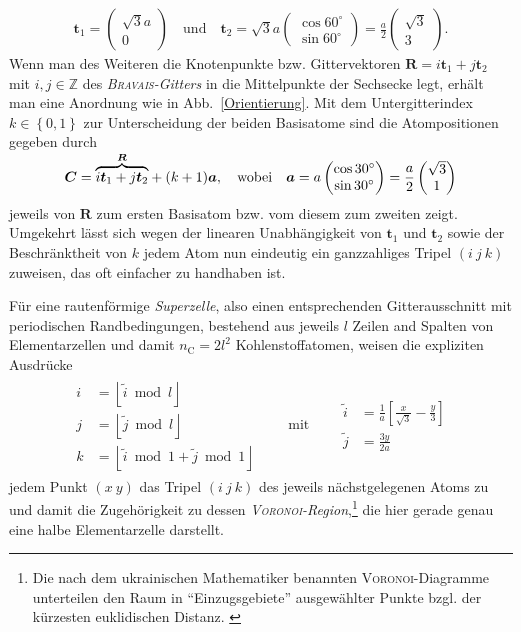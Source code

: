 \documentclass[a4paper, 10pt, twoside, openany]{book} %
\newcommand \bracks[1]{\left [ #1 \right ]}
\newcommand \braces[1]{\left \lbrace #1 \right \rbrace}
\newcommand \floor[1]{\left \lfloor #1 \right \rfloor}
\def \mod {\bmod}
\def \vec {\boldsymbol}
\newcommand \mat[1]{\begin{pmatrix} #1 \end{pmatrix}}
\def \nC {n_\mathrm{C}}
\begin{document}
%
\begin{align*}
    \vec t_1 = \mat{\sqrt 3 a \\ 0} \quad \text{und} \quad \vec t_2 = \sqrt{3} a \mat{\cos 60^\circ \\ \sin 60^\circ} = \frac a 2 \mat{\sqrt 3 \\ 3}.
\end{align*}
%
Wenn man des Weiteren die Knotenpunkte bzw. Gittervektoren $\vec R = i \vec t_1 + j \vec t_2$ mit $i, j \in \mathbb Z$ des \emph{\textsc{Bravais}-Gitters} in die Mittelpunkte der Sechsecke legt, erhält man eine Anordnung wie in Abb.~\ref{Orientierung}. Mit dem Untergitterindex $k \in \braces{0, 1}$ zur Unterscheidung der beiden Basisatome sind die Atompositionen gegeben durch
%
\begin{align*}
    \vec C = \smash{\overbrace{i \vec t_1 + j \vec t_2}^{\vec R}} + (k + 1) \vec a, \quad \text{wobei} \quad \vec a = a \mat{\cos 30^\circ \\ \sin 30^\circ} = \frac a 2 \mat{\sqrt 3 \\ 1}
\end{align*}
%
jeweils von $\vec R$ zum ersten Basisatom bzw. vom diesem zum zweiten zeigt. Umgekehrt lässt sich wegen der linearen Unabhängigkeit von $\vec t_1$ und $\vec t_2$ sowie der Beschränktheit von $k$ jedem Atom nun eindeutig ein ganzzahliges Tripel $(i \ j \ k)$ zuweisen, das oft einfacher zu handhaben ist.

Für eine rautenförmige \emph{Superzelle}, also einen entsprechenden Gitterausschnitt mit periodischen Randbedingungen, bestehend aus jeweils $l$ Zeilen and Spalten von Elementarzellen und damit $\nC = 2 l^2$ Kohlenstoffatomen, weisen die expliziten Ausdrücke
%
\begin{align}
    \begin{aligned}
        i &= \floor{\tilde i \mod l} \\
        j &= \floor{\tilde j \mod l} \\
        k &= \floor{\tilde i \mod 1 + \tilde j \mod 1}
    \end{aligned}
    \qquad \text{mit} \qquad
    \begin{aligned}
        \tilde i &= \frac 1 a \bracks{\frac x {\sqrt 3} - \frac y 3} \\
        \tilde j &= \frac{3 y}{2 a}
    \end{aligned}
    \label{ijk}
\end{align}
%
jedem Punkt $(x \ y)$ das Tripel $(i \ j \ k)$ des jeweils nächstgelegenen Atoms zu und damit die Zugehörigkeit zu dessen \emph{\textsc{Voronoi}-Region},\footnote{Die nach dem ukrainischen Mathematiker benannten \textsc{Voronoi}-Diagramme unterteilen den Raum in "`Einzugsgebiete"' ausgewählter Punkte bzgl. der kürzesten euklidischen Distanz. \cite[S.~10]{Edelsbrunner}} die hier gerade genau eine halbe Elementarzelle darstellt.
\end{document}
